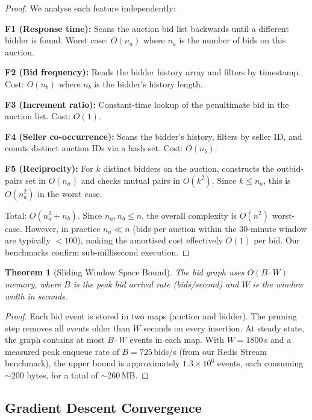\documentclass[11pt]{article}
\newtheorem{theorem}{Theorem}
\begin{document}
\begin{proof}
We analyse each feature independently:

\textbf{F1 (Response time):} Scans the auction bid list backwards until
a different bidder is found. Worst case: $O(n_a)$ where $n_a$ is the
number of bids on this auction.

\textbf{F2 (Bid frequency):} Reads the bidder history array and filters
by timestamp. Cost: $O(n_b)$ where $n_b$ is the bidder's history length.

\textbf{F3 (Increment ratio):} Constant-time lookup of the penultimate
bid in the auction list. Cost: $O(1)$.

\textbf{F4 (Seller co-occurrence):} Scans the bidder's history, filters
by seller ID, and counts distinct auction IDs via a hash set. Cost:
$O(n_b)$.

\textbf{F5 (Reciprocity):} For $k$ distinct bidders on the auction,
constructs the outbid-pairs set in $O(n_a)$ and checks mutual pairs in
$O(k^2)$. Since $k \leq n_a$, this is $O(n_a^2)$ in the worst case.

Total: $O(n_a^2 + n_b)$. Since $n_a, n_b \leq n$, the overall complexity
is $O(n^2)$ worst-case. However, in practice $n_a \ll n$ (bids per auction
within the 30-minute window are typically $< 100$), making the amortised
cost effectively $O(1)$ per bid. Our benchmarks confirm sub-millisecond
execution.
\end{proof}

\begin{theorem}[Sliding Window Space Bound]
The bid graph uses $O(B \cdot W)$ memory, where $B$ is the peak bid
arrival rate (bids/second) and $W$ is the window width in seconds.
\end{theorem}

\begin{proof}
Each bid event is stored in two maps (auction and bidder). The pruning
step removes all events older than $W$ seconds on every insertion. At
steady state, the graph contains at most $B \cdot W$ events in each map.
With $W = 1800$\,s and a measured peak enqueue rate of $B = 725$\,bids/s
(from our Redis Stream benchmark), the upper bound is approximately
$1.3 \times 10^6$ events, each consuming $\sim$200 bytes, for a total of
$\sim$260\,MB.
\end{proof}

\subsection{Gradient Descent Convergence}
\end{document}
